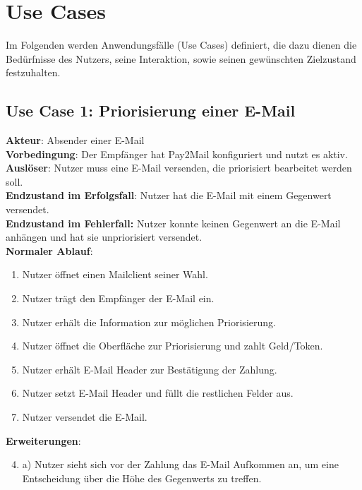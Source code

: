 \section{Use Cases}
\label{Use_Cases}
Im Folgenden werden Anwendungsfälle (Use Cases) definiert, die dazu dienen die Bedürfnisse des Nutzers, seine Interaktion, sowie seinen gewünschten Zielzustand festzuhalten.

\subsection*{Use Case 1: Priorisierung einer E-Mail}
\textbf{Akteur}: Absender einer E-Mail \\
\textbf{Vorbedingung}: Der Empfänger hat Pay2Mail konfiguriert und nutzt es aktiv. \\
\textbf{Auslöser}: Nutzer muss eine E-Mail versenden, die priorisiert bearbeitet werden soll. \\
\textbf{Endzustand im Erfolgsfall}: Nutzer hat die E-Mail mit einem Gegenwert versendet. \\
\textbf{Endzustand im Fehlerfall:} Nutzer konnte keinen Gegenwert an die E-Mail anhängen und hat sie unpriorisiert versendet. \\

\noindent \textbf{Normaler Ablauf}:
\begin{enumerate}
    \item Nutzer öffnet einen Mailclient seiner Wahl.
    \item Nutzer trägt den Empfänger der E-Mail ein.
    \item Nutzer erhält die Information zur möglichen Priorisierung.
    \item Nutzer öffnet die Oberfläche zur Priorisierung und zahlt Geld/Token.
    \item Nutzer erhält E-Mail Header zur Bestätigung der Zahlung.
    \item Nutzer setzt E-Mail Header und füllt die restlichen Felder aus.
    \item Nutzer versendet die E-Mail.
\end{enumerate}

\noindent \textbf{Erweiterungen}:
\begin{enumerate}
\setcounter{enumi}{3}
    \item a) Nutzer sieht sich vor der Zahlung das E-Mail Aufkommen an, um eine Entscheidung über die Höhe des Gegenwerts zu treffen.
\end{enumerate}

